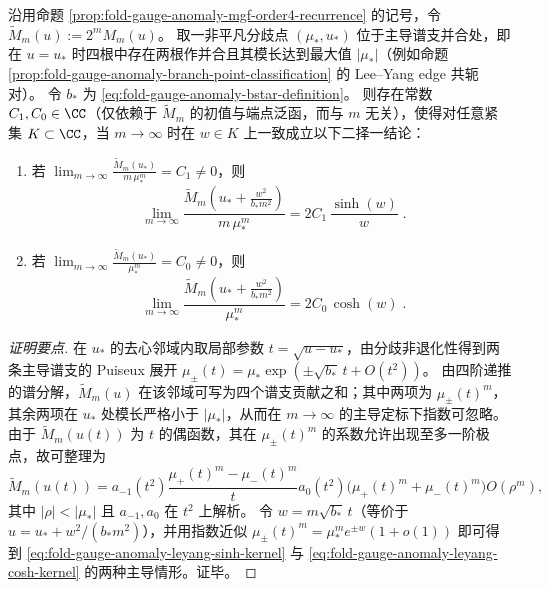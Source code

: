 \begin{theorem}\label{thm:fold-gauge-anomaly-leyang-universal-kernels}
沿用命题 \ref{prop:fold-gauge-anomaly-mgf-order4-recurrence} 的记号，令 \(\widetilde M_m(u):=2^mM_m(u)\)。
取一非平凡分歧点 \((\mu_\ast,u_\ast)\) 位于主导谱支并合处，即在 \(u=u_\ast\) 时四根中存在两根作并合且其模长达到最大值 \(|\mu_\ast|\)（例如命题 \ref{prop:fold-gauge-anomaly-branch-point-classification} 的 Lee--Yang edge 共轭对）。
令 \(b_\ast\) 为 \eqref{eq:fold-gauge-anomaly-bstar-definition}。
则存在常数 \(C_1,C_0\in\CC\)（仅依赖于 \(\widetilde M_m\) 的初值与端点泛函，而与 \(m\) 无关），使得对任意紧集 \(K\subset\CC\)，当 \(m\to\infty\) 时在 \(w\in K\) 上一致成立以下二择一结论：
\begin{enumerate}
  \item 若 \(\displaystyle \lim_{m\to\infty}\frac{\widetilde M_m(u_\ast)}{m\,\mu_\ast^{m}}=C_1\neq 0\)，则
  \begin{equation}\label{eq:fold-gauge-anomaly-leyang-sinh-kernel}
  \boxed{\;
  \lim_{m\to\infty}\frac{\widetilde M_m\!\left(u_\ast+\frac{w^2}{b_\ast m^2}\right)}{m\,\mu_\ast^{m}}
  =2C_1\,\frac{\sinh(w)}{w}\; }.
  \end{equation}
  \item 若 \(\displaystyle \lim_{m\to\infty}\frac{\widetilde M_m(u_\ast)}{\mu_\ast^{m}}=C_0\neq 0\)，则
  \begin{equation}\label{eq:fold-gauge-anomaly-leyang-cosh-kernel}
  \boxed{\;
  \lim_{m\to\infty}\frac{\widetilde M_m\!\left(u_\ast+\frac{w^2}{b_\ast m^2}\right)}{\mu_\ast^{m}}
  =2C_0\,\cosh(w)\; }.
  \end{equation}
\end{enumerate}
\end{theorem}
\begin{proof}[证明要点]
在 \(u_\ast\) 的去心邻域内取局部参数 \(t=\sqrt{u-u_\ast}\)，由分歧非退化性得到两条主导谱支的 Puiseux 展开
\(
\mu_\pm(t)=\mu_\ast\exp(\pm \sqrt{b_\ast}\,t+O(t^2))
\)。
由四阶递推的谱分解，\(\widetilde M_m(u)\) 在该邻域可写为四个谱支贡献之和；其中两项为 \(\mu_\pm(t)^m\)，其余两项在 \(u_\ast\) 处模长严格小于 \(|\mu_\ast|\)，从而在 \(m\to\infty\) 的主导定标下指数可忽略。
由于 \(\widetilde M_m(u(t))\) 为 \(t\) 的偶函数，其在 \(\mu_\pm(t)^m\) 的系数允许出现至多一阶极点，故可整理为
\[
\widetilde M_m(u(t))
=a_{-1}(t^2)\frac{\mu_+(t)^m-\mu_-(t)^m}{t}
a_0(t^2)\bigl(\mu_+(t)^m+\mu_-(t)^m\bigr)
O(\rho^m),
\]
其中 \(|\rho|<|\mu_\ast|\) 且 \(a_{-1},a_0\) 在 \(t^2\) 上解析。
令 \(w=m\sqrt{b_\ast}\,t\)（等价于 \(u=u_\ast+w^2/(b_\ast m^2)\)），并用指数近似
\(
\mu_\pm(t)^m=\mu_\ast^m e^{\pm w}(1+o(1))
\)
即可得到 \eqref{eq:fold-gauge-anomaly-leyang-sinh-kernel} 与 \eqref{eq:fold-gauge-anomaly-leyang-cosh-kernel} 的两种主导情形。证毕。
\end{proof}

